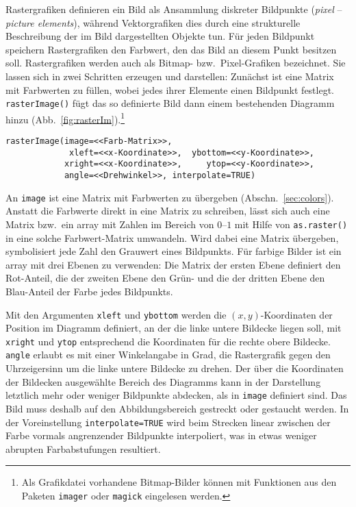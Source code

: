 Rastergrafiken definieren ein Bild als Ansammlung diskreter Bildpunkte (\emph{pixel} -- \emph{picture elements}), während Vektorgrafiken dies durch eine strukturelle Beschreibung der im Bild dargestellten Objekte tun. Für jeden Bildpunkt speichern Rastergrafiken den Farbwert, den das Bild an diesem Punkt besitzen soll. Rastergrafiken werden auch als Bitmap- bzw.\ Pixel-Grafiken bezeichnet. Sie lassen sich in zwei Schritten erzeugen und darstellen: Zunächst ist eine Matrix mit Farbwerten zu füllen, wobei jedes ihrer Elemente einen Bildpunkt festlegt. \lstinline!rasterImage()! fügt das so definierte Bild dann einem bestehenden Diagramm hinzu (Abb.\ \ref{fig:rasterIm}).\footnote{Als Grafikdatei vorhandene Bitmap-Bilder können mit Funktionen aus den Paketen \lstinline!imager! \cite{Barthelme2019} oder \lstinline!magick! \cite{Ooms2024} eingelesen werden.}
\begin{lstlisting}
rasterImage(image=<<Farb-Matrix>>,
             xleft=<<x-Koordinate>>,  ybottom=<<y-Koordinate>>,
            xright=<<x-Koordinate>>,     ytop=<<y-Koordinate>>,
            angle=<<Drehwinkel>>, interpolate=TRUE)
\end{lstlisting}

An \lstinline!image! ist eine Matrix mit Farbwerten zu übergeben (Abschn.\ \ref{sec:colors}). Anstatt die Farbwerte direkt in eine Matrix zu schreiben, lässt sich auch eine Matrix bzw.\ ein array mit Zahlen im Bereich von $0$--$1$ mit Hilfe von \lstinline!as.raster()! in eine solche Farbwert-Matrix umwandeln. Wird dabei eine Matrix übergeben, symbolisiert jede Zahl den Grauwert eines Bildpunkts. Für farbige Bilder ist ein array mit drei Ebenen zu verwenden: Die Matrix der ersten Ebene definiert den Rot-Anteil, die der zweiten Ebene den Grün- und die der dritten Ebene den Blau-Anteil der Farbe jedes Bildpunkts.

Mit den Argumenten \lstinline!xleft! und \lstinline!ybottom! werden die $(x, y)$-Koordinaten der Position im Diagramm definiert, an der die linke untere Bildecke liegen soll, mit \lstinline!xright! und \lstinline!ytop! entsprechend die Koordinaten für die rechte obere Bildecke. \lstinline!angle! erlaubt es mit einer Winkelangabe in Grad, die Rastergrafik gegen den Uhrzeigersinn um die linke untere Bildecke zu drehen. Der über die Koordinaten der Bildecken ausgewählte Bereich des Diagramms kann in der Darstellung letztlich mehr oder weniger Bildpunkte abdecken, als in \lstinline!image! definiert sind. Das Bild muss deshalb auf den Abbildungsbereich gestreckt oder gestaucht werden. In der Voreinstellung \lstinline!interpolate=TRUE! wird beim Strecken linear zwischen der Farbe vormals angrenzender Bildpunkte interpoliert, was in etwas weniger abrupten Farbabstufungen resultiert.

